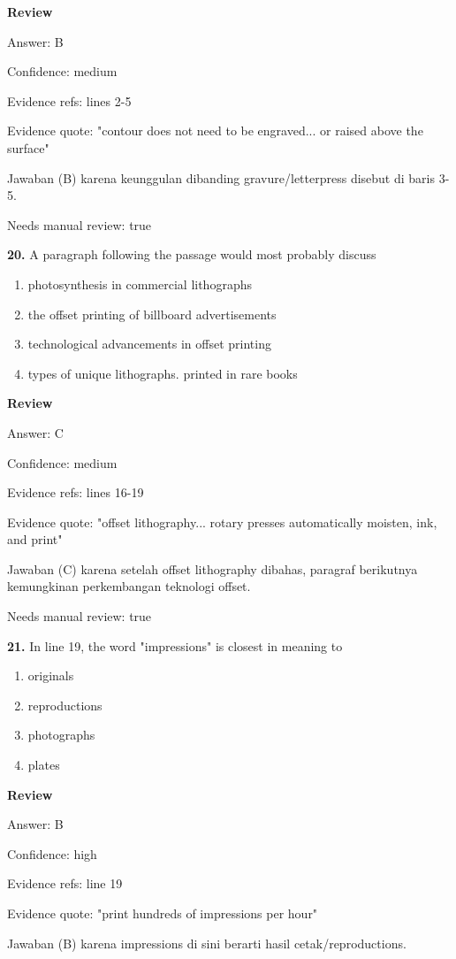 \documentclass[12pt]{article}
\begin{document}
\begingroup
\setlength{\parskip}{0pt}
\setlength{\parindent}{0pt}
\textbf{Review}\par
Answer: B\par
Confidence: medium\par
Evidence refs: lines 2-5\par
Evidence quote: "contour does not need to be engraved... or raised above the surface"\par
Jawaban (B) karena keunggulan dibanding gravure/letterpress disebut di baris 3-5.\par
Needs manual review: true\par
\endgroup
\par
\vspace{0.25\baselineskip}
\noindent\textbf{20.} A paragraph following the passage would most probably discuss
\begin{enumerate}[label=(\Alph*),leftmargin=*,itemsep=0.2em]
\item photosynthesis in commercial lithographs
\item the offset printing of billboard advertisements
\item technological advancements in offset printing
\item types of unique lithographs. printed in rare books
\end{enumerate}
\par
\begingroup
\setlength{\parskip}{0pt}
\setlength{\parindent}{0pt}
\textbf{Review}\par
Answer: C\par
Confidence: medium\par
Evidence refs: lines 16-19\par
Evidence quote: "offset lithography... rotary presses automatically moisten, ink, and print"\par
Jawaban (C) karena setelah offset lithography dibahas, paragraf berikutnya kemungkinan perkembangan teknologi offset.\par
Needs manual review: true\par
\endgroup
\par
\vspace{0.25\baselineskip}
\noindent\textbf{21.} In line 19, the word "impressions" is closest in meaning to
\begin{enumerate}[label=(\Alph*),leftmargin=*,itemsep=0.2em]
\item originals
\item reproductions
\item photographs
\item plates
\end{enumerate}
\par
\begingroup
\setlength{\parskip}{0pt}
\setlength{\parindent}{0pt}
\textbf{Review}\par
Answer: B\par
Confidence: high\par
Evidence refs: line 19\par
Evidence quote: "print hundreds of impressions per hour"\par
Jawaban (B) karena impressions di sini berarti hasil cetak/reproductions.\par
\endgroup
\par
\vspace{0.25\baselineskip}
\end{document}
